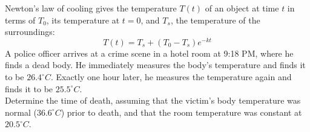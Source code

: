 \documentclass[a4paper, 12pt]{report}
\def\ni{blue!20!white}
\begin{document}
    
    \newpage
    \begin{tcolorbox}[title={\color{black}{\section{Q3}}}, colback=white, colframe=\ni, boxrule=1mm, width=1\textwidth]
        \centering
        Newton's law of cooling gives the temperature \( T(t) \) of an object at time \( t \) in terms of \( T_0 \), its temperature at \( t = 0 \), and \( T_s \), the temperature of the surroundings:
        \[
        T(t) = T_s + (T_0 - T_s)e^{-kt}
        \]
        A police officer arrives at a crime scene in a hotel room at 9:18 PM, where he finds a dead body. He immediately measures the body's temperature and finds it to be \( 26.4^\circ C \). Exactly one hour later, he measures the temperature again and finds it to be \( 25.5^\circ C \).\\[6pt]
        Determine the time of death, assuming that the victim's body temperature was normal (\( 36.6^\circ C \)) prior to death, and that the room temperature was constant at \( 20.5^\circ C \).
    \end{tcolorbox}
    
\end{document}
